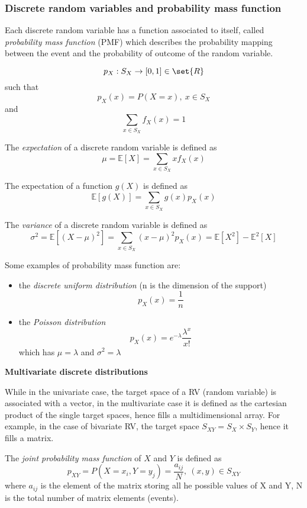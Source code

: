 \subsubsection{Discrete random variables and probability mass function}

Each discrete random variable has a function associated to itself, called \textit{probability mass function} (PMF) which describes the probability mapping between the event and the probability of outcome of the random variable.

$$ p_X: S_X \rightarrow [0,1] \in \set{R} $$
such that
$$ p_X(x) = P(X = x),\ x \in S_X $$
and
$$ \sum_{x \in S_X}{f_X(x)} = 1 $$

\begin{definition}
    The \textit{expectation} of a discrete random variable is defined as
    $$ \mu = \mathbb{E}[X] = \sum_{x \in S_X}{xf_X(x)} $$
\end{definition}

The expectation of a function $g(X)$ is defined as
$$ \mathbb{E}[g(X)] = \sum_{x \in S_X}{g(x)p_X(x)} $$

\begin{definition}
    The \textit{variance} of a discrete random variable is defined as
    $$ \sigma^2 = \mathbb{E}[(X - \mu)^2] = \sum_{x \in S_X}{(x - \mu)^2p_X(x)} = \mathbb{E}[X^2] - \mathbb{E}^2[X] $$
\end{definition}

Some examples of probability mass function are:

\begin{itemize}
    \item the \textit{discrete uniform distribution} (n is the dimension of the support)
    $$ p_X(x) = \frac{1}{n} $$
    \item the \textit{Poisson distribution}
    $$ p_X(x) = e^{-\lambda}\frac{\lambda^x}{x!} $$
    which has $\mu = \lambda$ and $\sigma^2 = \lambda$
\end{itemize}

\textbf{Multivariate discrete distributions}

While in the univariate case, the target space of a RV (random variable) is associated with a vector, in the multivariate case it is defined as the cartesian product of the single target spaces, hence fills a multidimensional array.
For example, in the case of bivariate RV, the target space $S_{XY}=S_X \times S_Y$, hence it fills a matrix.

\begin{definition}
    The \textit{joint probability mass function} of $X$ and $Y$ is defined as
    $$ p_{XY} = P(X = x_i, Y = y_j)=\frac{a_{ij}}{N},\ (x, y) \in S_{XY} $$
    where $a_{ij}$ is the element of the matrix storing all he possible values of X and Y, N is the total number of matrix elements (events). 
\end{definition}

